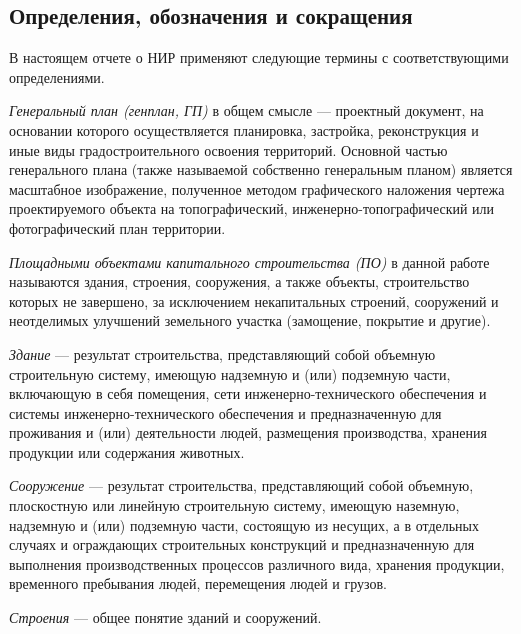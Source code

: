 \subsection*{\Large{Определения, обозначения и сокращения}}

В настоящем отчете о НИР применяют следующие термины с соответствующими определениями.

\textit{Генеральный план (генплан, ГП)} в общем смысле —
проектный документ, на основании которого осуществляется планировка,
застройка, реконструкция и иные виды градостроительного освоения территорий.
Основной частью генерального плана (также называемой собственно генеральным планом)
является масштабное изображение, полученное методом графического наложения чертежа
проектируемого объекта на топографический,
инженерно-топографический или фотографический план территории.


\textit{Площадными объектами капитального строительства (ПО)} в данной работе называются
здания, строения, сооружения, а также объекты, строительство которых не завершено, за исключением некапитальных строений,
сооружений и неотделимых улучшений земельного участка (замощение, покрытие и другие).


\textit{Здание} — результат строительства, представляющий собой объемную строительную систему,
имеющую надземную и (или) подземную части, включающую в себя помещения,
сети инженерно-технического обеспечения и системы инженерно-технического обеспечения и предназначенную для проживания и
(или) деятельности людей, размещения производства, хранения продукции или содержания животных.


\textit{Сооружение} — результат строительства,
представляющий собой объемную, плоскостную или линейную строительную систему,
имеющую наземную, надземную и (или) подземную части, состоящую из несущих,
а в отдельных случаях и ограждающих строительных конструкций и предназначенную для выполнения
производственных процессов различного вида, хранения продукции, временного пребывания людей, перемещения людей и грузов.


\textit{Строения} — общее понятие зданий и сооружений.
\newpage
